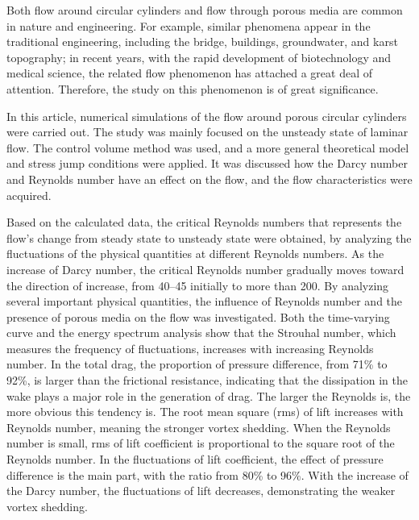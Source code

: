 \begin{eabstract}
Both flow around circular cylinders and flow through porous media are common in nature and engineering. For example, similar phenomena appear in the traditional engineering, including the bridge, buildings, groundwater, and karst topography; in recent years, with the rapid development of biotechnology and medical science, the related flow phenomenon has attached a great deal of attention. Therefore, the study on this phenomenon is of great significance.

In this article, numerical simulations of the flow around porous circular cylinders were carried out. The study was mainly focused on the unsteady state of laminar flow. The control volume method was used, and a more general theoretical model and stress jump conditions were applied. It was discussed how the Darcy number and Reynolds number have an effect on the flow, and the flow characteristics were acquired.

Based on the calculated data, the critical Reynolds numbers that represents the flow's change from steady state to unsteady state were obtained, by analyzing the fluctuations of the physical quantities at different Reynolds numbers. As the increase of Darcy number, the critical Reynolds number gradually moves toward the direction of increase, from 40--45 initially to more than 200. By analyzing several important physical quantities, the influence of Reynolds number and the presence of porous media on the flow was investigated. Both the time-varying curve and the energy spectrum analysis show that the Strouhal number, which measures the frequency of fluctuations, increases with increasing Reynolds number. In the total drag, the proportion of pressure difference, from 71\% to 92\%, is larger than the frictional resistance, indicating that the dissipation in the wake plays a major role in the generation of drag. The larger the Reynolds is, the more obvious this tendency is. The root mean square (rms) of lift increases with Reynolds number, meaning the stronger vortex shedding. When the Reynolds number is small, rms of lift coefficient is proportional to the square root of the Reynolds number. In the fluctuations of lift coefficient, the effect of pressure difference is the main part, with the ratio from 80\% to 96\%. With the increase of the Darcy number, the fluctuations of lift decreases, demonstrating the weaker vortex shedding.
\end{eabstract}
